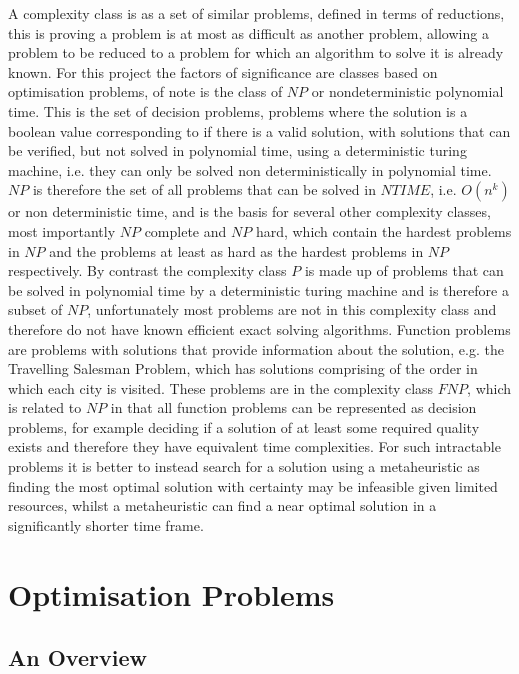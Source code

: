 \documentclass[]{final_report}
\begin{document}
A complexity class is as a set of similar problems, defined in terms of reductions, this is proving a problem is at most as difficult as another problem, allowing a problem to be reduced to a problem for which an algorithm to solve it is already known. For this project the factors of significance are classes based on optimisation problems, of note is the class of $NP$ or nondeterministic polynomial time. This is the set of decision problems, problems where the solution is a boolean value corresponding to if there is a valid solution, with solutions that can be verified, but not solved in polynomial time, using a deterministic turing machine, i.e. they can only be solved non deterministically in polynomial time\cite{barak:2007}. $NP$ is therefore the set of all problems that can be solved in $NTIME$, i.e. $O(n^{k})$ or non deterministic time, and is the basis for several other complexity classes, most importantly $NP$ complete and $NP$ hard, which contain the hardest problems in $NP$ and the problems at least as hard as the hardest problems in $NP$ respectively. By contrast the complexity class $P$ is made up of problems that can be solved in polynomial time by a deterministic turing machine and is therefore a subset of $NP$, unfortunately most problems are not in this complexity class and therefore do not have known efficient exact solving algorithms\cite{barak:2007}. Function problems are problems with solutions that provide information about the solution, e.g. the Travelling Salesman Problem, which has solutions comprising of the order in which each city is visited. These problems are in the complexity class $FNP$, which is related to $NP$ in that all function problems can be represented as decision problems, for example deciding if a solution of at least some required quality exists and therefore they have equivalent time complexities\cite{barak:2007}. For such intractable problems it is better to instead search for a solution using a metaheuristic as finding the most optimal solution with certainty may be infeasible given limited resources, whilst a metaheuristic can find a near optimal solution in a significantly shorter time frame.

\newpage
\section*{Optimisation Problems}

\subsection*{An Overview}
\end{document}
